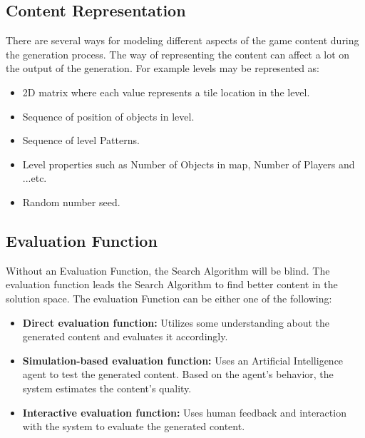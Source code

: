 \subsection{Content Representation}
There are several ways for modeling different aspects of the game content during the generation process. The way of representing the content can affect a lot on the output of the generation. For example levels may be represented as: \cite{pcgBookSearch}
\begin{itemize}\itemsep0pt \parskip0pt 
	\item 2D matrix where each value represents a tile location in the level.
	\item Sequence of position of objects in level.
	\item Sequence of level Patterns.
	\item Level properties such as Number of Objects in map, Number of Players and ...etc.
	\item Random number seed.
\end{itemize}

\subsection{Evaluation Function}
Without an Evaluation Function, the Search Algorithm will be blind. The evaluation function leads the Search Algorithm to find better content in the solution space. The evaluation Function can be either one of the following: \cite{pcgBookSearch}
\begin{itemize}\itemsep0pt \parskip0pt 
	\item \textbf{Direct evaluation function:} Utilizes some understanding about the generated content and evaluates it accordingly.
	\item \textbf{Simulation-based evaluation function:} Uses an Artificial Intelligence agent to test the generated content. Based on the agent's behavior, the system estimates the content's quality.
	\item \textbf{Interactive evaluation function:} Uses human feedback and interaction with the system to evaluate the generated content.
\end{itemize}

